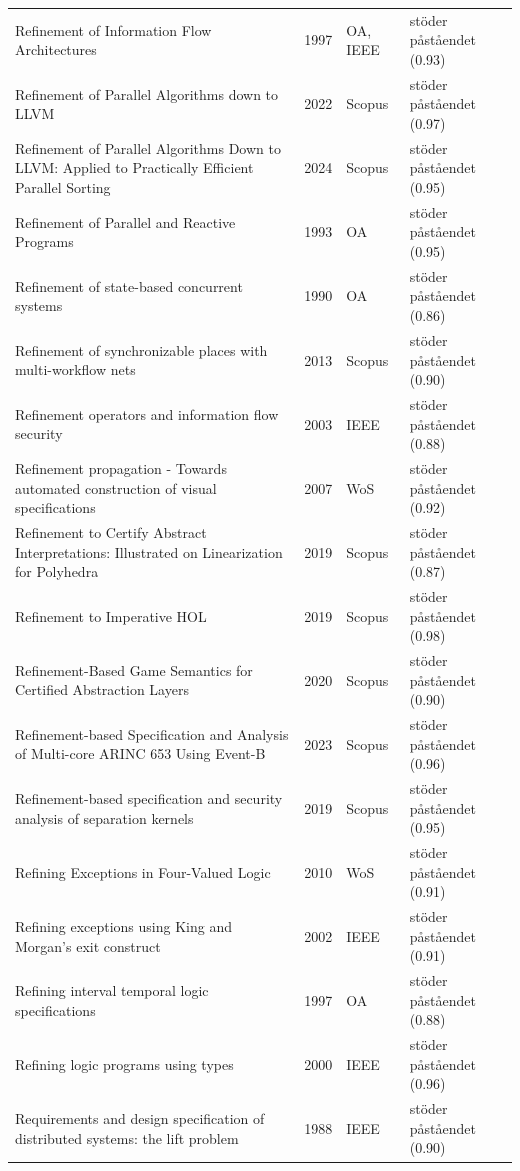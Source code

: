\begin{longtable}{@{}%
  >{\raggedright\arraybackslash}p{}c%
  >{\raggedright\arraybackslash}p{}%
  >{\raggedright\arraybackslash}p{}@{}}
Refinement of Information Flow Architectures & 1997 & OA, IEEE & stöder påståendet (0.93) \\
Refinement of Parallel Algorithms down to LLVM & 2022 & Scopus & stöder påståendet (0.97) \\
Refinement of Parallel Algorithms Down to LLVM: Applied to Practically Efficient Parallel Sorting & 2024 & Scopus & stöder påståendet (0.95) \\
Refinement of Parallel and Reactive Programs & 1993 & OA & stöder påståendet (0.95) \\
Refinement of state-based concurrent systems & 1990 & OA & stöder påståendet (0.86) \\
Refinement of synchronizable places with multi-workflow nets & 2013 & Scopus & stöder påståendet (0.90) \\
Refinement operators and information flow security & 2003 & IEEE & stöder påståendet (0.88) \\
Refinement propagation - Towards automated construction of visual specifications & 2007 & WoS & stöder påståendet (0.92) \\
Refinement to Certify Abstract Interpretations: Illustrated on Linearization for Polyhedra & 2019 & Scopus & stöder påståendet (0.87) \\
Refinement to Imperative HOL & 2019 & Scopus & stöder påståendet (0.98) \\
Refinement-Based Game Semantics for Certified Abstraction Layers & 2020 & Scopus & stöder påståendet (0.90) \\
Refinement-based Specification and Analysis of Multi-core ARINC 653 Using Event-B & 2023 & Scopus & stöder påståendet (0.96) \\
Refinement-based specification and security analysis of separation kernels & 2019 & Scopus & stöder påståendet (0.95) \\
Refining Exceptions in Four-Valued Logic & 2010 & WoS & stöder påståendet (0.91) \\
Refining exceptions using King and Morgan's exit construct & 2002 & IEEE & stöder påståendet (0.91) \\
Refining interval temporal logic specifications & 1997 & OA & stöder påståendet (0.88) \\
Refining logic programs using types & 2000 & IEEE & stöder påståendet (0.96) \\
Requirements and design specification of distributed systems: the lift problem & 1988 & IEEE & stöder påståendet (0.90) \\

\end{longtable}
